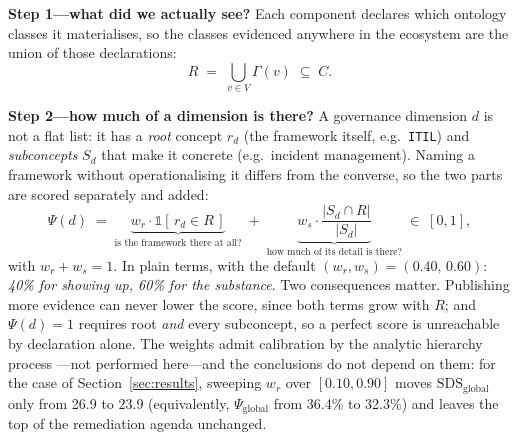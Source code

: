 \documentclass[engproc,proceedingpaper,submit,moreauthors]{Definitions/mdpi}
\begin{document}
\textbf{Step 1---what did we actually see?} Each component declares which ontology classes it materialises, so the classes evidenced anywhere in the ecosystem are the union of those declarations:
\begin{equation}
R \;=\; \bigcup_{v \in V} \Gamma(v) \;\subseteq\; C .
\label{eq:coverage-set}
\end{equation}

\textbf{Step 2---how much of a dimension is there?} A governance dimension $d$ is not a flat list: it has a \emph{root} concept $r_d$ (the framework itself, e.g.\ \texttt{ITIL}) and \emph{subconcepts} $S_d$ that make it concrete (e.g.\ incident management). Naming a framework without operationalising it differs from the converse, so the two parts are scored separately and added:
\begin{equation}
\Psi(d) \;=\; \underbrace{w_r \cdot \mathbb{1}\!\left[\, r_d \in R \,\right]}_{\text{is the framework there at all?}} \;+\; \underbrace{w_s \cdot \frac{\lvert S_d \cap R \rvert}{\lvert S_d \rvert}}_{\text{how much of its detail is there?}}\;\in\;[0,1],
\label{eq:psi}
\end{equation}
with $w_r+w_s=1$. In plain terms, with the default $(w_r,w_s)=(0.40,\,0.60)$: \emph{40\% for showing up, 60\% for the substance}. Two consequences matter. Publishing more evidence can never lower the score, since both terms grow with $R$; and $\Psi(d)=1$ requires root \emph{and} every subconcept, so a perfect score is unreachable by declaration alone. The weights admit calibration by the analytic hierarchy process \cite{Saaty1990}---not performed here---and the conclusions do not depend on them: for the case of Section~\ref{sec:results}, sweeping $w_r$ over $[0.10,0.90]$ moves $\mathrm{SDS}_{\mathrm{global}}$ only from 26.9 to 23.9 (equivalently, $\Psi_{\mathrm{global}}$ from 36.4\% to 32.3\%) and leaves the top of the remediation agenda unchanged.
\end{document}
